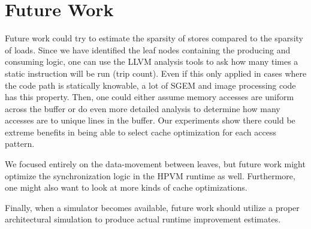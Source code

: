 \section{Future Work}
Future work could try to estimate the sparsity of stores compared to the sparsity of loads. Since we have identified the leaf nodes containing the producing and consuming logic, one can use the LLVM analysis tools \cite{LLVM} to ask how many times a static instruction will be run (trip count). Even if this only applied in cases where the code path is statically knowable, a lot of SGEM and image processing code has this property. Then, one could either assume memory accesses are uniform across the buffer or do even more detailed analysis to determine how many accesses are to unique lines in the buffer. Our experiments show there could be extreme benefits in being able to select cache optimization for each access pattern.

We focused entirely on the data-movement between leaves, but future work might optimize the synchronization logic in the HPVM runtime as well. Furthermore, one might also want to look at more kinds of cache optimizations.

Finally, when a simulator becomes available, future work should utilize a proper architectural simulation to produce actual runtime improvement estimates.